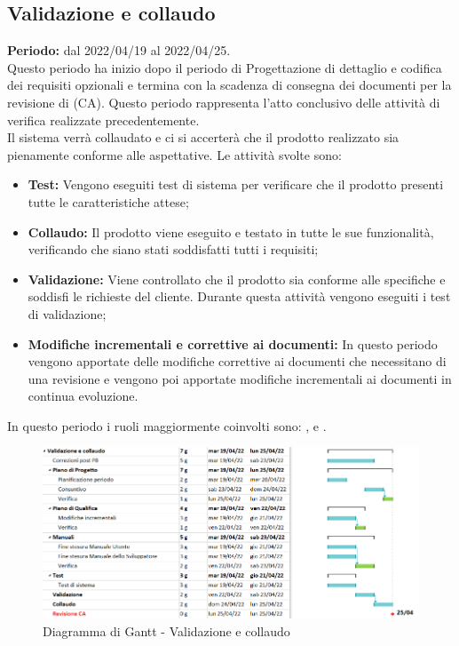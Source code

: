 \subsection{Validazione e collaudo} \label{subsection:pianificazione_validazione}
\textbf{Periodo:} dal 2022/04/19 al 2022/04/25.
\bigskip
\\Questo periodo ha inizio dopo il periodo di Progettazione di dettaglio e codifica dei requisiti opzionali e termina con la scadenza di consegna dei documenti per la revisione di \CA{} (CA\glo{}).
Questo periodo rappresenta l'atto conclusivo delle attività di verifica realizzate precedentemente.
\\Il sistema verrà collaudato e ci si accerterà che il prodotto realizzato sia pienamente conforme alle aspettative.
Le attività svolte sono:
\begin{itemize}
  \item \textbf{Test:} Vengono eseguiti test di sistema per verificare che il prodotto presenti tutte le caratteristiche attese;
  \item \textbf{Collaudo:} Il prodotto viene eseguito e testato in tutte le sue funzionalità, verificando che siano stati soddisfatti tutti i requisiti;
  \item \textbf{Validazione:} Viene controllato che il prodotto sia conforme alle specifiche e soddisfi le richieste del cliente.
        Durante questa attività vengono eseguiti i test di validazione;
  \item \textbf{Modifiche incrementali e correttive ai documenti:} In questo periodo vengono apportate delle modifiche correttive ai documenti che necessitano di una revisione e vengono poi apportate modifiche incrementali ai documenti in continua evoluzione.
\end{itemize}
In questo periodo i ruoli maggiormente coinvolti sono: \roleDesignerLow{}, \roleProgrammerLow{} e \roleVerifierLow{}.
\bigskip
\begin{figure}[H]
  \centering
  \includegraphics[scale=0.54]{immagini/validazione_collaudo.png}
  \caption{Diagramma di Gantt - Validazione e collaudo}
\end{figure}
\pagebreak